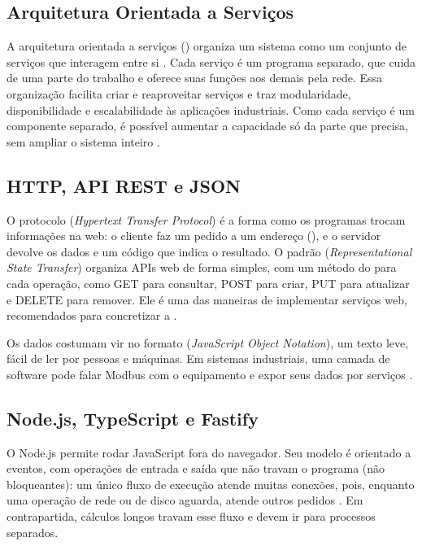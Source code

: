 \subsection{Arquitetura Orientada a Serviços}

\par A arquitetura orientada a serviços () organiza um sistema como um conjunto de serviços que interagem entre si \cite{PISCHING2017}. Cada serviço é um programa separado, que cuida de uma parte do trabalho e oferece suas funções aos demais pela rede. Essa organização facilita criar e reaproveitar serviços e traz modularidade, disponibilidade e escalabilidade às aplicações industriais. Como cada serviço é um componente separado, é possível aumentar a capacidade só da parte que precisa, sem ampliar o sistema inteiro \cite{BIGHETI2020}.

\subsection{HTTP, API REST e JSON}

\par O protocolo  (\emph{Hypertext Transfer Protocol}) é a forma como os programas trocam informações na web: o cliente faz um pedido a um endereço (), e o servidor devolve os dados e um código que indica o resultado. O padrão  (\emph{Representational State Transfer}) organiza APIs web de forma simples, com um método do  para cada operação, como GET para consultar, POST para criar, PUT para atualizar e DELETE para remover. Ele é uma das maneiras de implementar serviços web, recomendados para concretizar a  \cite{PISCHING2017}.

\par Os dados costumam vir no formato  (\emph{JavaScript Object Notation}), um texto leve, fácil de ler por pessoas e máquinas. Em sistemas industriais, uma camada de software pode falar Modbus com o equipamento e expor seus dados por serviços  \cite{BIGHETI2020}.

\subsection{Node.js, TypeScript e Fastify}

\par O Node.js permite rodar JavaScript fora do navegador. Seu modelo é orientado a eventos, com operações de entrada e saída que não travam o programa (não bloqueantes): um único fluxo de execução atende muitas conexões, pois, enquanto uma operação de rede ou de disco aguarda, atende outros pedidos \cite{NODEJS_DOCS}. Em contrapartida, cálculos longos travam esse fluxo e devem ir para processos separados.

